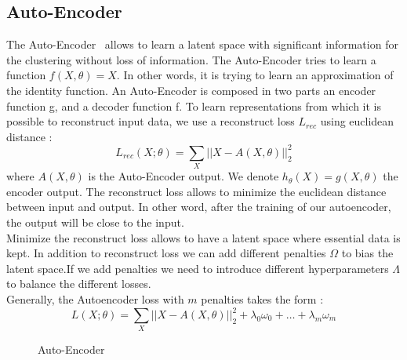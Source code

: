 \subsection{Auto-Encoder}
The Auto-Encoder~\cite{Goodfellow-et-al-2016} allows to learn a latent space with significant
information for the clustering without loss of information.
The Auto-Encoder tries to learn a function $f (X, \theta) = X$. In
other words, it is trying to learn an approximation of the identity
function. An Auto-Encoder is composed in two parts an encoder function
g, and a decoder function f. To learn representations from which it is 
possible to reconstruct input data, we use a
reconstruct loss $L_{rec}$ using euclidean distance :
\begin{equation}
  L_{rec}(X; \theta) = \sum\limits_X|| X - A(X, \theta) ||_2^2 
\end{equation}
where $A(X, \theta)$ is the Auto-Encoder output.
We denote $h_\theta(X) = g(X,\theta)$ the encoder output.
The reconstruct loss allows to minimize the euclidean distance between input and 
output. In other word, after the training of our autoencoder, the output will be
close  to the input.
\\Minimize the reconstruct loss allows to have a latent space where essential 
data is kept. In addition to reconstruct loss we can add different penalties 
$\Omega$ to bias the latent space.If we add penalties we need to introduce
different hyperparameters $\Lambda$ to balance the different losses.
\\Generally, the Autoencoder loss with $m$ penalties takes the form :
\begin{equation} 
L(X;\theta) = \sum\limits_X|| X - A(X, \theta) ||_2^2 + \lambda_0 \omega_0 + 
\ldots + \lambda_m \omega_m  
\end{equation}
\begin{figure}
  \centering
  \caption{Auto-Encoder}
  \label{fig:autoenc}
\end{figure}
